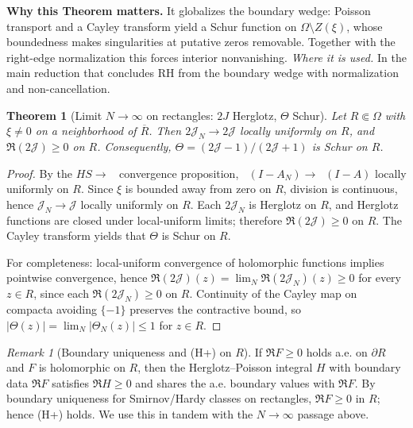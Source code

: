 \documentclass[11pt]{article}
\newtheorem{theorem}{Theorem}[section]
\theoremstyle{definition}
\theoremstyle{remark}
\newtheorem{remark}{Remark}[section]
\DeclareMathOperator{\dettwo}{det_2}
\begin{document}
\vspace{1.0cm}
\noindent\textbf{Why this Theorem matters.} It globalizes the boundary wedge: Poisson transport and a Cayley transform yield a Schur function on $\Omega\setminus Z(\xi)$, whose boundedness makes singularities at putative zeros removable. Together with the right-edge normalization this forces interior nonvanishing.
\noindent\textit{Where it is used.} In the main reduction that concludes RH from the boundary wedge with normalization and non-cancellation.
\begin{theorem}[Limit \(N\to\infty\) on rectangles: \(2J\) Herglotz, \(\Theta\) Schur]\label{thm:limit-rect}
Let \(R\Subset\Omega\) with \(\xi\neq 0\) on a neighborhood of \(\overline R\). Then \(2\mathcal J_N\to 2\mathcal J\) locally uniformly on \(R\), and \(\Re(2\mathcal J)\ge 0\) on \(R\). Consequently, \(\Theta=(2\mathcal J-1)/(2\mathcal J+1)\) is Schur on \(R\).
\end{theorem}
\begin{proof}
By the \(HS\to\dettwo\) convergence proposition, $\dettwo(I-A_N)\to \dettwo(I-A)$ locally uniformly on $R$. Since $\xi$ is bounded away from zero on $R$, division is continuous, hence $\mathcal J_N\to \mathcal J$ locally uniformly on $R$. Each $2\mathcal J_N$ is Herglotz on $R$, and Herglotz functions are closed under local-uniform limits; therefore $\Re(2\mathcal J)\ge 0$ on $R$. The Cayley transform yields that $\Theta$ is Schur on $R$.

For completeness: local-uniform convergence of holomorphic functions implies pointwise convergence, hence $\Re(2\mathcal J)(z)=\lim_N \Re(2\mathcal J_N)(z)\ge 0$ for every $z\in R$, since each $\Re(2\mathcal J_N)\ge 0$ on $R$. Continuity of the Cayley map on compacta avoiding $\{-1\}$ preserves the contractive bound, so $|\Theta(z)|=\lim_N |\Theta_N(z)|\le 1$ for $z\in R$.
\end{proof}
\begin{remark}[Boundary uniqueness and (H+) on $R$]\label{rem:boundary-uniqueness}
If $\Re F\ge 0$ holds a.e. on $\partial R$ and $F$ is holomorphic on $R$, then the Herglotz–Poisson integral $H$ with boundary data $\Re F$ satisfies $\Re H\ge 0$ and shares the a.e. boundary values with $\Re F$. By boundary uniqueness for Smirnov/Hardy classes on rectangles, $\Re F\ge 0$ in $R$; hence (H+) holds. We use this in tandem with the $N\to\infty$ passage above.
\end{remark}
\end{document}

